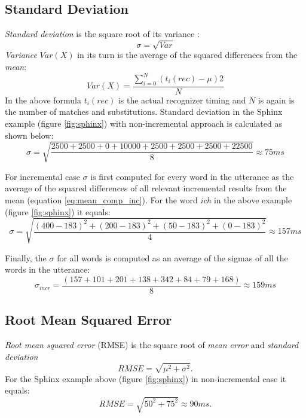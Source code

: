 \subsection {Standard Deviation}
\textit {Standard deviation} is the square root of its variance
:\begin{equation} \sigma=\sqrt {Var}
\end{equation}
\textit {Variance} $Var(X)$ in its turn is the average of the squared
differences from the \textit {mean}:
\begin{equation} Var(X)=\frac{\sum_{i=0}^N (t_i(rec)-\mu)2}{N}
\end{equation}
In the above formula $t_i(rec)$ is the actual recognizer timing and $N$ is again
is the number of matches and substitutions.  Standard deviation in the Sphinx
example (figure \ref{fig:sphinx}) with non-incremental approach is calculated as
shown below:
\begin{equation} \sigma=\sqrt {\frac
{2500+2500+0+10000+2500+2500+2500+22500}{8}}\approx 75 ms
\end{equation}

For incremental case $\sigma$ is first computed for every word in the utterance
as the average of the squared differences of all relevant incremental results from
the mean (equation \ref{eq:mean_comp_inc}). For the word \textit {ich} in the
above example (figure \ref{fig:sphinx}) it equals:
\begin{equation} \sigma=\sqrt {\frac
{(400-183)^2+(200-183)^2+(50-183)^2+(0-183)^2}{4}}\approx 157 ms
\end{equation}

Finally, the $\sigma$ for all words is computed as an average of the sigmas of
all the words in the utterance:
\begin{equation} \sigma_{incr}=\frac
{(157+101+ 201+138+342+ 84 +79 +168 )}{8}\approx 159
ms
\end{equation}


\subsection {Root Mean Squared Error}
\textit {Root mean squared error} (RMSE) is the square root of  \textit {mean
error}  and \textit {standard deviation} \begin{equation} RMSE=\sqrt
{\mu^2+\sigma^2}. 
\end{equation}
For the Sphinx example above  (figure \ref{fig:sphinx}) in  non-incremental case
it equals:
\begin{equation} RMSE=\sqrt
{50^2+75^2} \approx 90 ms. 
\end{equation}

